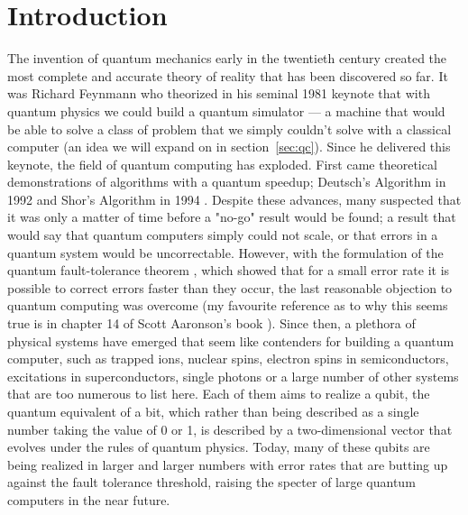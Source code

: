 \chapter{Introduction}

The invention of quantum mechanics early in the twentieth century created the most complete and accurate
theory of reality that has been discovered so far. It was Richard Feynmann who theorized in his
seminal 1981 keynote \cite{Feynman1982} that with quantum physics we could build a quantum simulator ---
a machine that would be able to solve a class of problem that we simply couldn't solve with a
classical computer (an idea we will expand on in section~\ref{sec:qc}). Since he delivered this keynote, the
field of quantum computing has exploded. First came theoretical demonstrations of algorithms
with a quantum speedup; Deutsch's Algorithm in 1992 \cite{Deutsch} and Shor's Algorithm in 1994 \cite{Shor}.
Despite these advances, many suspected that it was only a matter of time before a "no-go" result would
be found; a result that would say that quantum computers simply could not scale, or that errors in a
quantum system would be uncorrectable.
However, with the formulation of the quantum fault-tolerance theorem \cite{1996quant.ph.11025A}, which
showed that for a small error rate it is possible to correct errors faster than they occur, the last
reasonable objection to quantum computing was overcome (my favourite reference as to why this seems true
is in chapter 14 of Scott Aaronson's book \cite{Aaronson:skepticism}). Since then, a plethora of physical
systems have emerged that seem like contenders for building a quantum computer, such as trapped
ions, nuclear spins, electron spins in semiconductors, excitations in superconductors, single photons
or a large number of other systems that are too numerous to list here. Each of them aims to realize a qubit,
the quantum equivalent of a bit, which rather than being described as a single number taking the value of
0 or 1, is described by a two-dimensional vector that evolves under the rules of quantum physics. Today,
many of these qubits are being realized in larger and larger numbers with error rates that are butting up
against the fault tolerance threshold, raising the specter of large quantum computers in the near future.

